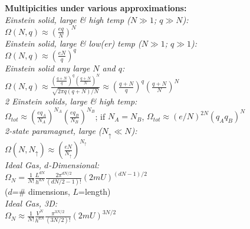 \documentclass[letterpaper,landscape,10pt]{article}
\begin{document}
{\begin{multicols}{4}
	\textbf{Multipicities under various approximations:} \\
	\hspace{5pt} \emph{Einstein solid, large \& high temp ($N\gg 1$; $q\gg N$):} \\
	\hspace{10pt} $\Omega(N,q) \approx \left( \frac{eq}{N} \right)^N$ \\
	\hspace{5pt} \emph{Einstein solid, large \& low(er) temp ($N\gg 1$; $q\gg 1$):} \\
	\hspace{10pt} $\Omega(N,q) \approx \left( \frac{eN}{q} \right)^q$ \\
	\hspace{5pt} \emph{Einstein solid any large $N$ and $q$:} \\
	\hspace{10pt} $\Omega(N,q) \approx \frac{\left( \frac{q+N}{q} \right)^q \left( \frac{q+N}{N} \right)^N}{\sqrt{2\pi q\left( q+N \right)/N}}\approx \left( \frac{q+N}{q} \right)^q \left( \frac{q+N}{N} \right)^N$ \\
	\hspace{5pt} \emph{2 Einstein solids, large \& high temp:} \\
	\hspace{10pt} $\Omega_{tot} \approx \left( \frac{eq_A}{N_A} \right)^{N_A} \left( \frac{eq_B}{N_B} \right)^{N_B}$; if $N_A = N_B$,  $\Omega_{tot} \approx (e/N)^{2N}(q_A q_B)^N$\\
	\hspace{5pt} \emph{2-state paramagnet, large ($N_{\uparrow} \ll N$):} \\
	\hspace{10pt} $\Omega(N,N_{\uparrow}) \approx \left( \frac{eN}{N_{\uparrow}} \right)^{N_{\uparrow}}$ \\
	\hspace{5pt} \emph{Ideal Gas, $d$-Dimensional:} \\
	\hspace{10pt} $\Omega_N = \frac{1}{N!} \frac{L^{dN}}{h^{dN}} \frac{2\pi^{dN/2}}{\left( dN/2 - 1 \right)!} \left( 2mU \right)^{\left( dN-1 \right)/2}$ \\
	\hspace{10pt} ($d$=\# dimensions, $L$=length)  \\
	\hspace{5pt} \emph{Ideal Gas, 3D:} \\
	\hspace{10pt} $\Omega_N \approx \frac{1}{N!} \frac{V^{N}}{h^{dN}} \frac{\pi^{3N/2}}{\left( 3N/2 \right)!} \left( 2mU \right)^{3N/2}$ \\

\end{multicols}}
\end{document}
